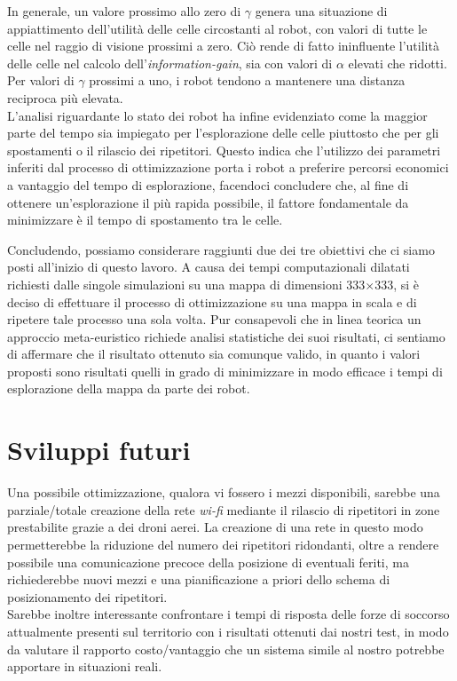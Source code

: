 In generale, un valore prossimo allo zero di $\gamma$ genera una situazione di appiattimento dell'utilità delle celle circostanti al robot, con valori di tutte le celle nel raggio di visione prossimi a zero.
Ciò rende di fatto ininfluente l'utilità delle celle nel calcolo dell'\textit{information-gain}, sia con valori di $\alpha$ elevati che ridotti. 
Per valori di $\gamma$ prossimi a uno, i robot tendono a mantenere una distanza reciproca più elevata.\\
L'analisi riguardante lo stato dei robot ha infine evidenziato come la maggior parte del tempo sia impiegato per l'esplorazione delle celle piuttosto che per gli spostamenti o il rilascio dei ripetitori.
Questo indica che l'utilizzo dei parametri inferiti dal processo di ottimizzazione porta i robot a preferire percorsi economici a vantaggio del tempo di esplorazione, facendoci concludere che, al fine di ottenere un'esplorazione il più rapida possibile, il fattore fondamentale da minimizzare è il tempo di spostamento tra le celle.

Concludendo, possiamo considerare raggiunti due dei tre obiettivi che ci siamo posti all'inizio di questo lavoro.
A causa dei tempi computazionali dilatati richiesti dalle singole simulazioni su una mappa di dimensioni 333$\times$333, si è deciso di effettuare il processo di ottimizzazione su una mappa in scala e di ripetere tale processo una sola volta.
Pur consapevoli che in linea teorica un approccio meta-euristico richiede analisi statistiche dei suoi risultati, ci sentiamo di affermare che il risultato ottenuto sia comunque valido, in quanto i valori proposti sono risultati quelli in grado di minimizzare in modo efficace i tempi di esplorazione della mappa da parte dei robot. 
\section{Sviluppi futuri}
Una possibile ottimizzazione, qualora vi fossero i mezzi disponibili, sarebbe una parziale/totale creazione della rete \textit{wi-fi} mediante il rilascio di ripetitori in zone prestabilite grazie a dei droni aerei.
La creazione di una rete in questo modo permetterebbe la riduzione del numero dei ripetitori ridondanti, oltre a rendere possibile una comunicazione precoce della posizione di eventuali feriti, ma richiederebbe nuovi mezzi e una pianificazione a priori dello schema di posizionamento dei ripetitori.\\
Sarebbe inoltre interessante confrontare i tempi di risposta delle forze di soccorso attualmente presenti sul territorio con i risultati ottenuti dai nostri test, in modo da valutare il rapporto costo/vantaggio che un sistema simile al nostro potrebbe apportare in situazioni reali.